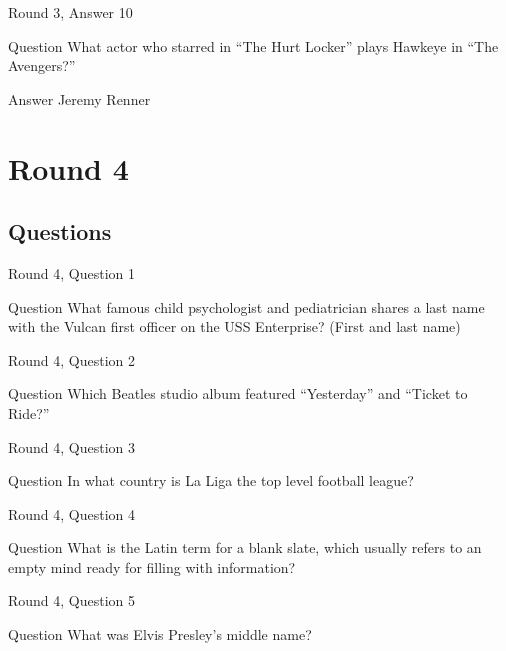 \documentclass[11pt]{beamer}
\begin{document}
\begin{frame}{Round 3, Answer 10}
\begin{block}{Question}
What actor who starred in ``The Hurt Locker'' plays Hawkeye in ``The Avengers?''
\end{block}
\pause{}
\begin{block}{Answer}
Jeremy Renner
\end{block}
\end{frame}
    

\section{Round 4}
    
\subsection{Questions}

\begin{frame}{Round 4, Question 1}
\begin{block}{Question}
What famous child psychologist and pediatrician shares a last name with the Vulcan first officer on the USS Enterprise? (First and last name)
\end{block}
\end{frame}
    

\begin{frame}{Round 4, Question 2}
\begin{block}{Question}
Which Beatles studio album featured ``Yesterday'' and ``Ticket to Ride?''
\end{block}
\end{frame}
    

\begin{frame}{Round 4, Question 3}
\begin{block}{Question}
In what country is La Liga the top level football league\@?
\end{block}
\end{frame}
    

\begin{frame}{Round 4, Question 4}
\begin{block}{Question}
What is the Latin term for a blank slate, which usually refers to an empty mind ready for filling with information\@?
\end{block}
\end{frame}
    

\begin{frame}{Round 4, Question 5}
\begin{block}{Question}
What was Elvis Presley's middle name\@?
\end{block}
\end{frame}
    
\end{document}
